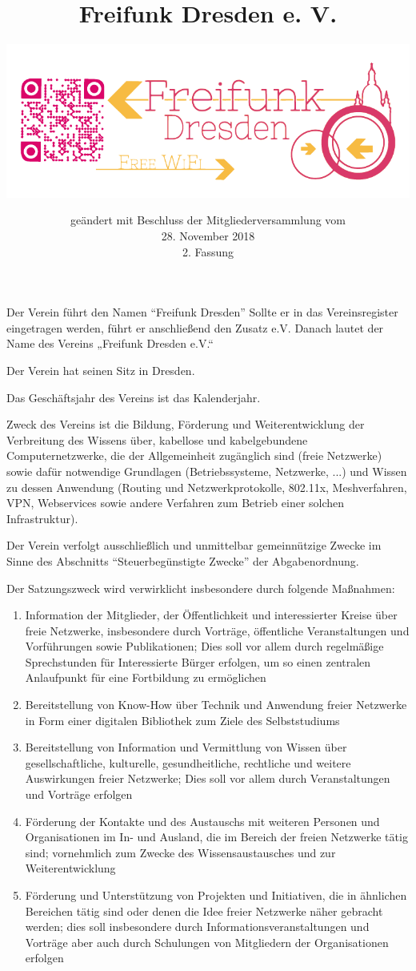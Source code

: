 \documentclass[parskip]{scrartcl}
\title{Freifunk Dresden e. V.}
\subtitle{\href{https://www.freifunk-dresden.de}{\includegraphics{img/Logo_Freifunk_Dresden}}}
\date{geändert mit Beschluss der Mitgliederversammlung vom\\28. November 2018\\2. Fassung}
\begin{document}
\maketitle
\tableofcontents\newpage

\begin{contract} %

Der Verein führt den Namen “Freifunk Dresden” Sollte er in das Vereinsregister eingetragen werden, führt er anschließend den Zusatz e.V. Danach lautet der Name des Vereins „Freifunk Dresden e.V.“

Der Verein hat seinen Sitz in Dresden.

Das Geschäftsjahr des Vereins ist das Kalenderjahr.


Zweck des Vereins ist die Bildung, Förderung und Weiterentwicklung der Verbreitung des Wissens über, kabellose und kabelgebundene Computernetzwerke, die der Allgemeinheit zugänglich sind (freie Netzwerke) sowie dafür notwendige Grundlagen (Betriebssysteme, Netzwerke, ...) und Wissen zu dessen Anwendung (Routing und Netzwerkprotokolle, 802.11x, Meshverfahren, VPN, Webservices sowie andere Verfahren zum Betrieb einer solchen Infrastruktur).

Der Verein verfolgt ausschließlich und unmittelbar gemeinnützige Zwecke im Sinne des Abschnitts “Steuerbegünstigte Zwecke” der Abgabenordnung.

Der Satzungszweck wird verwirklicht insbesondere durch folgende Maßnahmen:

\begin{enumerate}
\item Information der Mitglieder, der Öffentlichkeit und interessierter Kreise über freie Netzwerke, insbesondere durch Vorträge, öffentliche Veranstaltungen und Vorführungen sowie Publikationen; Dies soll vor allem durch regelmäßige Sprechstunden für Interessierte Bürger erfolgen, um so einen zentralen Anlaufpunkt für eine Fortbildung zu ermöglichen
\item Bereitstellung von Know-How über Technik und Anwendung freier Netzwerke in Form einer digitalen Bibliothek zum Ziele des Selbststudiums
\item Bereitstellung von Information und Vermittlung von Wissen über gesellschaftliche, kulturelle, gesundheitliche, rechtliche und weitere Auswirkungen freier Netzwerke; Dies soll vor allem durch Veranstaltungen und Vorträge erfolgen
\item Förderung der Kontakte und des Austauschs mit weiteren Personen und Organisationen im In- und Ausland, die im Bereich der freien Netzwerke tätig sind; vornehmlich zum Zwecke des Wissensaustausches und zur Weiterentwicklung
\item Förderung und Unterstützung von Projekten und Initiativen, die in ähnlichen Bereichen tätig sind oder denen die Idee freier Netzwerke näher gebracht werden; dies soll insbesondere durch Informationsveranstaltungen und Vorträge aber auch durch Schulungen von Mitgliedern der Organisationen erfolgen
\end{enumerate}


\end{contract}
\end{document}
